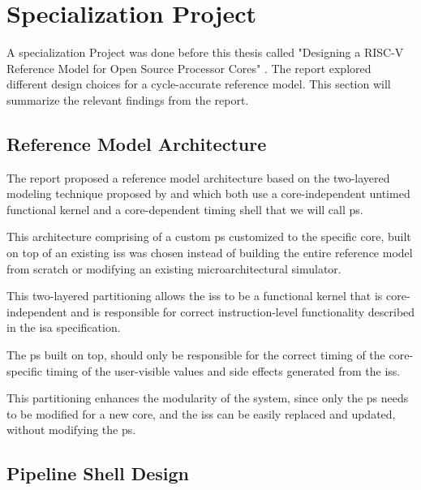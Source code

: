 \chapter{Specialization Project}
\label{ch:specialization}
\label{sec:specialization}

A specialization Project was done before this thesis called "Designing a RISC-V Reference Model for Open Source Processor Cores" \cite{torjenygaardeikenesDesigningRISCVReference2023}. The report explored different design choices for a cycle-accurate reference model. This section will summarize the relevant findings from the report.




\section{Reference Model Architecture}
\label{sec:pw_architecture}

The report proposed a reference model architecture based on the two-layered modeling technique proposed by \textcite{chiangEfficientTwolayeredCycleaccurate2009} and \textcite{leeFaCSimFastCycleAccurate2008} which both use a core-independent untimed functional kernel and a core-dependent timing shell that we will call \gls{ps}.

This architecture comprising of a custom \gls{ps} customized to the specific core, built on top of an existing \acrshort{iss} was chosen instead of building the entire reference model from scratch or modifying an existing microarchitectural simulator. 

This two-layered partitioning allows the \acrshort{iss} to be a functional kernel that is core-independent and is responsible for correct instruction-level functionality described in the \acrshort{isa} specification. 

The \gls{ps} built on top, should only be responsible for the correct timing of the core-specific timing of the user-visible values and side effects generated from the \acrshort{iss}. 

This partitioning enhances the modularity of the system, since only the \gls{ps} needs to be modified for a new core, and the \acrshort{iss} can be easily replaced and updated, without modifying the \gls{ps}. 


\section{Pipeline Shell Design}
\label{sec:pw_pipelineShellDesign}

